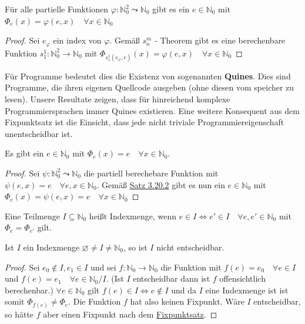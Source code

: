     Für alle partielle Funktionen \(\varphi : \mathbb{N}_0^2 \leadsto \mathbb{N}_0\) gibt es ein \(e \in \mathbb{N}_0\) mit \(\Phi_e(x) = \varphi(e, x) \quad \forall x \in \mathbb{N}_0\) 

    \begin{proof}
      Sei \(e_{\varphi}\) ein index von \(\varphi\). Gemäß \(s_n^m\) - Theorem gibt es eine berechenbare Funktion \(s_1^1 : \mathbb{N}_0^2 \to \mathbb{N}_0\) mit \(\Phi_{s^1_1 (e_{\varphi}, e)} (x) = \varphi (e, x) \quad \forall x \in \mathbb{N}_0\)
    \end{proof}

    Für Programme bedeutet dies die Existenz von sogenannten \textbf{Quines}. Dies sind Programme, die ihren eigenen Quellcode ausgeben (ohne diesen vom speicher zu lesen). Unsere Resultate zeigen, dass für hinreichend komplexe Programmiersprachen immer Quines existieren. Eine weitere Konsequent aus dem Fixpunktsatz ist die Einsicht, dass jede nicht triviale Programmiereigenschaft unentscheidbar ist.

    Es gibt ein \(e \in \mathbb{N}_0\) mit \(\Phi_e(x) = e \quad \forall x \in \mathbb{N}_0\).
    \begin{proof}
      Sei \(\psi : \mathbb{N}_0^2 \leadsto \mathbb{N}_0\) die partiell berechebare Funktion mit \(\psi(e, x) = e \quad \forall e, x \in \mathbb{N}_0\). Gemäß \hyperref[subsubsec:3.20.2]{Satz 3.20.2} gibt es nun ein \(e \in \mathbb{N}_0\) mit \(\Phi_e (x) = \psi (e,x) = e \quad \forall x \in \mathbb{N}_0\)
    \end{proof}

    Eine Teilmenge \(I \subseteq \mathbb{N}_0\) heißt Indexmenge, wenn \(e \in I \Leftrightarrow e' \in I \quad \forall e, e' \in \mathbb{N}_0\) mit \(\Phi_e = \Phi_{e'}\) gilt.

    Ist \(I\) ein Indexmenge \(\varnothing \not = I \not = \mathbb{N}_0\), so ist \(I\) nicht entscheidbar.
    \begin{proof}
      Sei \(e_0 \not \in I, e_1 \in I\) und sei \(f: \mathbb{N}_0 \to \mathbb{N}_0\) die Funktion mit \(f(e) = e_0 \quad \forall e \in I\) und \(f(e) = e_1 \quad \forall e \in \mathbb{N}_0 / I\). (Ist \(I\) entscheidbar dann ist \(f\) offensichtlich berechenbar.) \(\forall e \in \mathbb{N}_0\) gilt \(f(e) \in I \Leftrightarrow e \not \in I\) und da \(I\) eine Indexmenge ist ist somit \(\Phi_{f(e)} \not = \Phi_e\). Die Funktion \(f\) hat also keinen Fixpunkt. Wäre \(I\) entscheidbar, so hätte \(f\) aber einen Fixpunkt nach dem \hyperref[subsubsec:3.20.1]{Fixpunktsatz}.
    \end{proof}